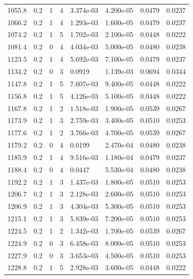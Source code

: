 \documentclass[preview]{standalone}
\begin{document}
{{{\begin{tabular}{L{1.2cm}C{1.2cm} C{0.3cm}C{0.5cm} C{1.4cm}C{1.4cm} C{1.4cm}C{1.4cm}}
  1055.8  &   0.2  & 1     &  4 &  3.374e-03  & 4.200e-05  & 0.0479 &  0.0237   \\ 
  1066.2  &   0.2  & 1     &  4 &  1.293e-03  & 1.600e-05  & 0.0479 &  0.0237   \\ 
  1074.2  &   0.2  & 1     &  5 &  1.702e-03  & 2.100e-05  & 0.0448 &  0.0222   \\ 
  1081.4  &   0.2  & 0     &  4 &  4.034e-03  & 5.000e-05  & 0.0480 &  0.0238   \\ 
  1123.5  &   0.2  & 1     &  4 &  5.692e-03  & 7.100e-05  & 0.0479 &  0.0237   \\ 
  1134.2  &   0.2  & 0     &  3 &  0.0919  & 1.139e-03  & 0.0694 &  0.0344   \\ 
  1147.8  &   0.2  & 1     &  5 &  7.607e-03  & 9.400e-05  & 0.0448 &  0.0222   \\ 
  1156.8  &   0.2  & 1     &  5 &  4.126e-03  & 5.100e-05  & 0.0448 &  0.0222   \\ 
  1167.8  &   0.2  & 1     &  2 &  1.518e-03  & 1.900e-05  & 0.0539 &  0.0267   \\ 
  1173.9  &   0.2  & 1     &  3 &  2.759e-03  & 3.400e-05  & 0.0510 &  0.0253   \\ 
  1177.6  &   0.2  & 1     &  2 &  3.766e-03  & 4.700e-05  & 0.0539 &  0.0267   \\ 
  1179.2  &   0.2  & 0     &  4 &  0.0199  & 2.470e-04  & 0.0480 &  0.0238   \\ 
  1185.9  &   0.2  & 1     &  4 &  9.516e-03  & 1.180e-04  & 0.0479 &  0.0237   \\ 
  1188.4  &   0.2  & 0     &  4 &  0.0447  & 5.530e-04  & 0.0480 &  0.0238   \\ 
  1192.2  &   0.2  & 1     &  3 &  1.437e-03  & 1.800e-05  & 0.0510 &  0.0253   \\ 
  1206.7  &   0.2  & 1     &  3 &  2.128e-03  & 2.600e-05  & 0.0510 &  0.0253   \\ 
  1206.9  &   0.2  & 1     &  3 &  4.304e-03  & 5.300e-05  & 0.0510 &  0.0253   \\ 
  1215.1  &   0.2  & 1     &  3 &  5.839e-03  & 7.200e-05  & 0.0510 &  0.0253   \\ 
  1224.5  &   0.2  & 1     &  2 &  1.342e-03  & 1.700e-05  & 0.0539 &  0.0267   \\ 
  1224.9  &   0.2  & 0     &  3 &  6.458e-03  & 8.000e-05  & 0.0510 &  0.0253   \\ 
  1227.9  &   0.2  & 0     &  3 &  3.653e-03  & 4.500e-05  & 0.0510 &  0.0253   \\ 
  1228.8  &   0.2  & 1     &  5 &  2.928e-03  & 3.600e-05  & 0.0448 &  0.0222   \\ 

\end{tabular}}}}
\end{document}
